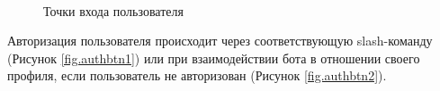 \begin{figure}
    \centering
    \\
    \caption{Точки входа пользователя}
\end{figure}

Авторизация пользователя происходит через соответствующую slash-команду (Рисунок {\color{blue} \ref{fig.authbtn1}}) или при взаимодействии бота в отношении своего профиля, если пользователь не авторизован (Рисунок {\color{blue} \ref{fig.authbtn2}}).

